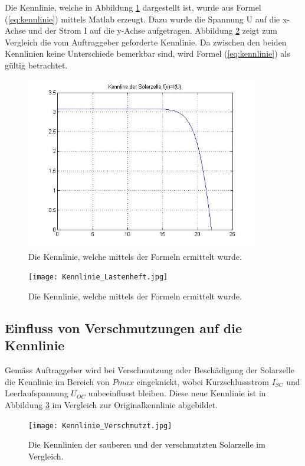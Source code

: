 Die Kennlinie, welche in Abbildung \ref{fig:Kennlinie} dargestellt ist, wurde aus Formel (\ref{eq:kennlinie}) mittels Matlab erzeugt. Dazu wurde die Spannung U auf die x-Achse und der Strom I auf die y-Achse aufgetragen. Abbildung \ref{fig:Kennlinie_Lastenheft} zeigt zum Vergleich die vom Auftraggeber geforderte Kennlinie. Da zwischen den beiden Kennlinien keine Unterschiede bemerkbar sind, wird Formel (\ref{eq:kennlinie}) als gültig betrachtet.
\begin{figure}
	\centering
		\includegraphics[width=0.9\textwidth]{Kennlinie.jpg}
	\caption{Die Kennlinie, welche mittels der Formeln ermittelt wurde.}
	\label{fig:Kennlinie}
\end{figure}
\begin{figure}
	\centering
		\texttt{[image: Kennlinie\_Lastenheft.jpg]}
	\caption{Die Kennlinie, welche mittels der Formeln ermittelt wurde.}
	\label{fig:Kennlinie_Lastenheft}
\end{figure}

\subsection{Einfluss von Verschmutzungen auf die Kennlinie}
Gemäss Auftraggeber wird bei Verschmutzung oder Beschädigung der Solarzelle die Kennlinie im Bereich von $Pmax$ eingeknickt, wobei Kurzschlussstrom $I_{SC}$ und Leerlaufspannung $U_{OC}$ unbeeinflusst bleiben. Diese neue Kennlinie ist in Abbildung \ref{fig:Kennlinie_Verschmutzt} im Vergleich zur Originalkennlinie abgebildet.
\begin{figure}
	\centering
		\texttt{[image: Kennlinie\_Verschmutzt.jpg]}
	\caption{Die Kennlinien der sauberen und der verschmutzten Solarzelle im Vergleich.}
	\label{fig:Kennlinie_Verschmutzt}
\end{figure}

